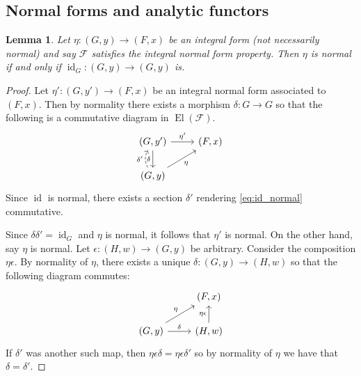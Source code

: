 \documentclass[12pt]{article}
\theoremstyle{plain}
\newtheorem{lemma}[thm]{Lemma}
\theoremstyle{definition}
\newcommand{\scr}[1]{\mathscr{#1}}
\newcommand{\lto}{\longrightarrow}
\begin{document}
\subsection{Normal forms and analytic functors}
\begin{lemma}\label{lem:int_id}
		Let $\eta: (G,y) \lto (F,x)$ be an integral form (not necessarily normal) and say $\scr{F}$ satisfies the integral normal form property. Then $\eta$ is normal if and only if $\operatorname{id}_G: (G, y) \lto (G,y)$ is.
	\end{lemma}
	\begin{proof}
		Let $\eta': (G, y') \lto (F,x)$ be an integral normal form associated to $(F,x)$. Then by normality there exists a morphism $\delta: G \lto G$ so that the following is a commutative diagram in $\operatorname{El}(\scr{F})$.
		\begin{equation}\label{eq:id_normal}
			\begin{tikzcd}
				(G, y')\arrow[d,swap,"{\delta}"]\arrow[r,"{\eta'}"] & (F,x)\\
				(G,y)\arrow[ur,swap,"{\eta}"]\arrow[u,bend left, dashed, "{\delta'}"]
				\end{tikzcd}
			\end{equation}
		Since $\operatorname{id}$ is normal, there exists a section $\delta'$ rendering \eqref{eq:id_normal} commutative.
		
		Since $\delta \delta' = \operatorname{id}_G$ and $\eta$ is normal, it follows that $\eta'$ is normal. On the other hand, say $\eta$ is normal. Let $\epsilon: (H, w) \lto (G,y)$ be arbitrary. Consider the composition $\eta \epsilon$. By normality of $\eta$, there exists a unique $\delta: (G, y) \lto (H, w)$ so that the following diagram commutes:
		\begin{equation}
			\begin{tikzcd}
				& (F,x)\\
				(G,y)\arrow[ur, "{\eta}"]\arrow[r,"{\delta}"] & (H,w)\arrow[u,"{\eta \epsilon}"]
				\end{tikzcd}
			\end{equation}
		If $\delta'$ was another such map, then $\eta \epsilon \delta = \eta \epsilon \delta'$ so by normality of $\eta$ we have that $\delta = \delta'$.
	\end{proof}
	
\end{document}
